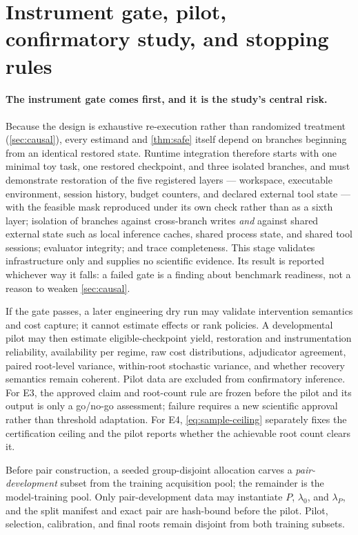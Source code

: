 \section{Instrument gate, pilot, confirmatory study, and stopping rules}
\label{sec:stages}

\paragraph{The instrument gate comes first, and it is the study's central risk.}
Because the design is exhaustive re-execution rather than randomized treatment
(\cref{sec:causal}), every estimand and \cref{thm:safe} itself depend on
branches beginning from an identical restored state.  Runtime integration
therefore starts with one minimal toy task, one restored checkpoint, and three
isolated branches, and must demonstrate restoration of the five registered
layers --- workspace, executable environment, session history, budget counters,
and declared external tool state --- with the feasible mask reproduced under its
own check rather than as a sixth layer; isolation of branches
against cross-branch writes \emph{and} against shared external state such as
local inference caches, shared process state, and shared tool sessions; evaluator
integrity; and trace completeness.  This stage validates infrastructure only and
supplies no scientific evidence.  Its result is reported whichever way it falls:
a failed gate is a finding about benchmark readiness, not a reason to weaken
\cref{sec:causal}.

If the gate passes, a later engineering dry run may validate intervention
semantics and cost capture; it cannot estimate effects or rank policies.  A
developmental pilot may then estimate eligible-checkpoint yield, restoration and
instrumentation reliability, availability per regime, raw cost distributions,
adjudicator agreement, paired root-level variance, within-root stochastic
variance, and whether recovery semantics remain coherent.  Pilot data are
excluded from confirmatory inference.  For E3, the approved claim and root-count
rule are frozen before the pilot and its output is only a go/no-go assessment;
failure requires a new scientific approval rather than threshold adaptation.
For E4, \cref{eq:sample-ceiling} separately fixes the certification ceiling and
the pilot reports whether the achievable root count clears it.

Before pair construction, a seeded group-disjoint allocation carves a
\emph{pair-development} subset from the training acquisition pool; the
remainder is the model-training pool.  Only pair-development data may
instantiate $P$, $\lambda_0$, and $\lambda_P$, and the split manifest and exact
pair are hash-bound before the pilot.  Pilot, selection, calibration, and final
roots remain disjoint from both training subsets.

